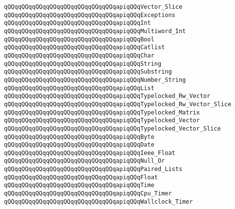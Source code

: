 \verb|qQQqqQQqqQQqqQQqqQQqqQQqqQQqqQQqapiqQQqVector_Slice|\newline
\verb|qQQqqQQqqQQqqQQqqQQqqQQqqQQqqQQqapiqQQqExceptions|\newline
\verb|qQQqqQQqqQQqqQQqqQQqqQQqqQQqqQQqapiqQQqInt|\newline
\verb|qQQqqQQqqQQqqQQqqQQqqQQqqQQqqQQqapiqQQqMultiword_Int|\newline
\verb|qQQqqQQqqQQqqQQqqQQqqQQqqQQqqQQqapiqQQqBool|\newline
\verb|qQQqqQQqqQQqqQQqqQQqqQQqqQQqqQQqapiqQQqCatlist|\newline
\verb|qQQqqQQqqQQqqQQqqQQqqQQqqQQqqQQqapiqQQqChar|\newline
\verb|qQQqqQQqqQQqqQQqqQQqqQQqqQQqqQQqapiqQQqString|\newline
\verb|qQQqqQQqqQQqqQQqqQQqqQQqqQQqqQQqapiqQQqSubstring|\newline
\verb|qQQqqQQqqQQqqQQqqQQqqQQqqQQqqQQqapiqQQqNumber_String|\newline
\verb|qQQqqQQqqQQqqQQqqQQqqQQqqQQqqQQqapiqQQqList|\newline
\verb|qQQqqQQqqQQqqQQqqQQqqQQqqQQqqQQqapiqQQqTypelocked_Rw_Vector|\newline
\verb|qQQqqQQqqQQqqQQqqQQqqQQqqQQqqQQqapiqQQqTypelocked_Rw_Vector_Slice|\newline
\verb|qQQqqQQqqQQqqQQqqQQqqQQqqQQqqQQqapiqQQqTypelocked_Matrix|\newline
\verb|qQQqqQQqqQQqqQQqqQQqqQQqqQQqqQQqapiqQQqTypelocked_Vector|\newline
\verb|qQQqqQQqqQQqqQQqqQQqqQQqqQQqqQQqapiqQQqTypelocked_Vector_Slice|\newline
\verb|qQQqqQQqqQQqqQQqqQQqqQQqqQQqqQQqapiqQQqByte|\newline
\verb|qQQqqQQqqQQqqQQqqQQqqQQqqQQqqQQqapiqQQqDate|\newline
\verb|qQQqqQQqqQQqqQQqqQQqqQQqqQQqqQQqapiqQQqIeee_Float|\newline
\verb|qQQqqQQqqQQqqQQqqQQqqQQqqQQqqQQqapiqQQqNull_Or|\newline
\verb|qQQqqQQqqQQqqQQqqQQqqQQqqQQqqQQqapiqQQqPaired_Lists|\newline
\verb|qQQqqQQqqQQqqQQqqQQqqQQqqQQqqQQqapiqQQqFloat|\newline
\verb|qQQqqQQqqQQqqQQqqQQqqQQqqQQqqQQqapiqQQqTime|\newline
\verb|qQQqqQQqqQQqqQQqqQQqqQQqqQQqqQQqapiqQQqCpu_Timer|\newline
\verb|qQQqqQQqqQQqqQQqqQQqqQQqqQQqqQQqapiqQQqWallclock_Timer|\newline
